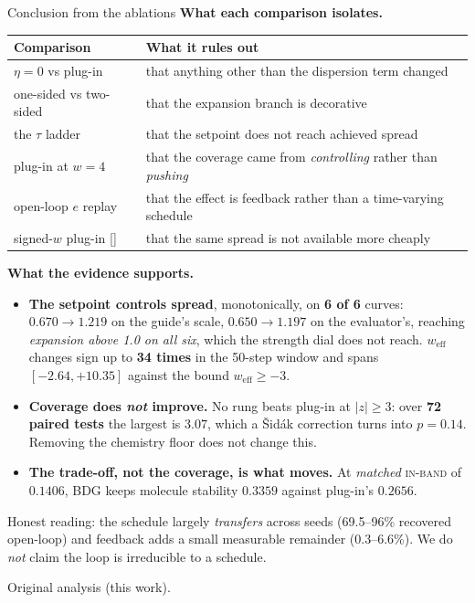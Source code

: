 \documentclass[aspectratio=169,10pt]{beamer}
\newcommand{\theslidelabel}{}
\newcommand{\lbl}[1]{\renewcommand{\theslidelabel}{#1}}
\newcommand{\srcs}[1]{\vfill{\raggedleft\color{grayt}\fontsize{4.9}{5.6}\selectfont #1\par}}
\newcommand{\TODO}[1]{\textcolor{accent}{\scriptsize[#1]}}
\newcommand{\weff}{w_{\mathrm{eff}}}
\newcommand{\ib}{\textsc{in-band}}
\newcommand{\take}[1]{\vspace{0.4ex}\colorbox{black!6}{\parbox{0.97\linewidth}{\footnotesize #1}}}
\begin{document}
\lbl{2d}
\begin{frame}[shrink=15]{Conclusion from the ablations}
  \textbf{What each comparison isolates.}
  {\small
  \begin{tabular}{ll}
    \toprule
    Comparison & What it rules out \\
    \midrule
    $\eta=0$ vs plug-in & that anything other than the dispersion term changed \\
    one-sided vs two-sided & that the expansion branch is decorative \\
    the $\tau$ ladder & that the setpoint does not reach achieved spread \\
    plug-in at $w{=}4$ & that the coverage came from \emph{controlling} rather than \emph{pushing} \\
    open-loop $e$ replay & that the effect is feedback rather than a time-varying schedule \\
    signed-$w$ plug-in \TODO{} & that the same spread is not available more cheaply \\
    \bottomrule
  \end{tabular}}

  \medskip
  \textbf{What the evidence supports.}
  \begin{itemize}\setlength\itemsep{0.1em}
    \item \textbf{The setpoint controls spread}, monotonically, on \textbf{6 of 6}
      curves: $0.670\to1.219$ on the guide's scale, $0.650\to1.197$ on the
      evaluator's, reaching \emph{expansion above 1.0 on all six}, which the strength
      dial does not reach. $\weff$ changes sign up to \textbf{34 times} in the
      50-step window and spans $[-2.64,+10.35]$ against the bound $\weff\ge-3$.
    \item \textbf{Coverage does \emph{not} improve.} No rung beats plug-in at
      $|z|\ge3$: over \textbf{72 paired tests} the largest is $3.07$, which a
      \v{S}id\'ak correction turns into $p=0.14$. Removing the chemistry floor does
      not change this.
    \item \textbf{The trade-off, not the coverage, is what moves.} At \emph{matched}
      \ib{} of $0.1406$, BDG keeps molecule stability $0.3359$ against plug-in's
      $0.2656$.
  \end{itemize}

  \take{Honest reading: the schedule largely \emph{transfers} across seeds (69.5--96\%
  recovered open-loop) and feedback adds a small measurable remainder (0.3--6.6\%).
  We do \emph{not} claim the loop is irreducible to a schedule.}

  \srcs{Original analysis (this work).}
\end{frame}
\end{document}
